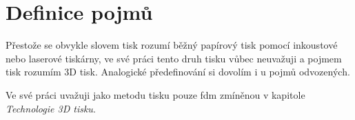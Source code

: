 \section{Definice pojmů}\label{3d-tisk-definice-pojmu}

Přestože se obvykle slovem tisk rozumí běžný papírový tisk pomocí inkoustové nebo laserové tiskárny,
ve své práci tento druh tisku vůbec neuvažuji a pojmem tisk rozumím 3D tisk.
Analogické předefinování si dovolím i u pojmů odvozených.

Ve své práci uvažuji jako metodu tisku pouze \acrshort{fdm} zmíněnou v kapitole \textit{Technologie 3D tisku}.
